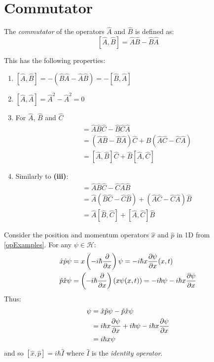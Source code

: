 \documentclass[../main.tex]{subfiles}
\begin{document}
\section{Commutator} \label{commSec}
\begin{definition}[Commutator]
  The \textit{commutator} of the operators $\hat{A}$ and $\hat{B}$ is defined as:
  \[
    [\hat{A},  \hat{B}] = \hat{A} \hat{B} - \hat{B} \hat{A}
  \]
\end{definition}
This has the following properties:
\begin{enumerate}
  \item $[\hat{A}, \hat{B}] = -(\hat{B}\hat{A} - \hat{A}\hat{B}) = -[\hat{B}, \hat{A}]$
  \item $[\hat{A}, \hat{A}] = \hat{A}^2 - \hat{A}^2 = 0$
  \item For $\hat{A}$, $\hat{B}$ and $\hat{C}$
    \begin{align*}
      [\hat{A}, \hat{B} \hat{C}] &= \hat{A}\hat{B}\hat{C} - \hat{B}\hat{C}\hat{A} \\
                                 &= (\hat{A}\hat{B} - \hat{B}\hat{A})\hat{C} + \hat{B}(\hat{A} \hat{C} - \hat{C} \hat{A}) \\
                                 &= [\hat{A}, \hat{B}] \hat{C} + \hat{B} [\hat{A}, \hat{C}]
    \end{align*}
  \item Similarly to \textbf{(iii)}:
    \begin{align*}
      [\hat{A} \hat{B}, \hat{C}] &= \hat{A}\hat{B}\hat{C} - \hat{C}\hat{A}\hat{B} \\
                                 &= \hat{A}(\hat{B}\hat{C} - \hat{C}\hat{B}) + (\hat{A}\hat{C} - \hat{C} \hat{A}) \hat{B} \\
                                 &= \hat{A} [\hat{B}, \hat{C}] + [\hat{A}, \hat{C}] \hat{B}
    \end{align*}
\end{enumerate}
\begin{example} \label{commExample}
  Consider the position and momentum operators $\hat{x}$ and $\hat{p}$ in 1D from \cref{opExamples}.
  For any $\psi \in \mathcal{H}$:
  \begin{align*}
    \hat{x} \hat{p} \psi &= x \left(-i\hbar \pderiv{}{x}\right)\psi = -i\hbar x \pderiv{\psi}{x}(x, t) \\
    \hat{p} \hat{x} \psi &= \left(-i\hbar \pderiv{}{x}\right) (x \psi(x, t)) = -i \hbar \psi - i \hbar x \pderiv{\psi}{x}
  \end{align*}
  Thus:
  \begin{align*}
    [\hat{x}, \hat{p}]\psi &= \hat{x}\hat{p}\psi - \hat{p}\hat{x}\psi \\
                           &= i\hbar x \pderiv{\psi}{x} + i\hbar\psi - i\hbar x \pderiv{\psi}{x} \\
                           &= i\hbar x \psi
  \end{align*}
  and so $[\hat{x}, \hat{p}] = i\hbar \hat{I}$ where $\hat{I}$ is the \textit{identity operator}.
\end{example}
\end{document}
